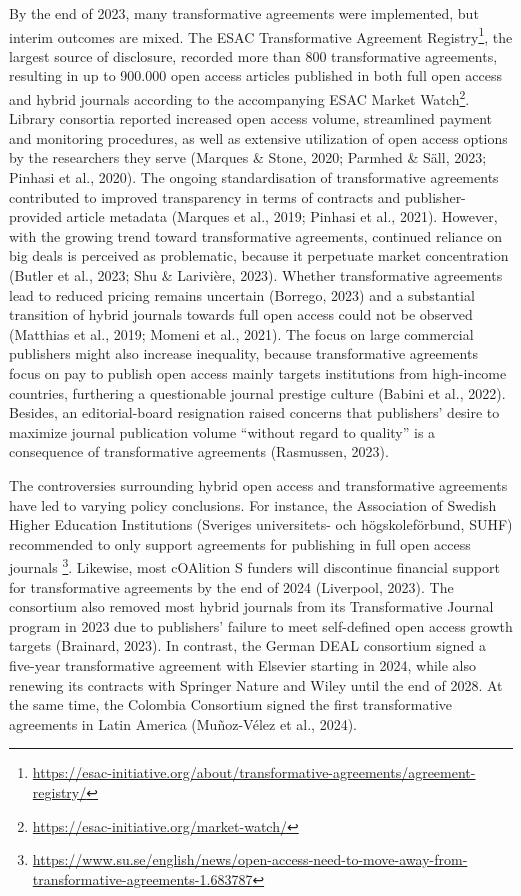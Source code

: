 \documentclass[a4paper,man,floatsintext,longtable,noextraspace,12pt]{apa6}
\begin{document}
By the end of 2023, many transformative agreements were implemented, but
interim outcomes are mixed. The ESAC Transformative Agreement
Registry\footnote{\url{https://esac-initiative.org/about/transformative-agreements/agreement-registry/}},
the largest source of disclosure, recorded more than 800 transformative
agreements, resulting in up to 900.000 open access articles published in
both full open access and hybrid journals according to the accompanying
ESAC Market Watch\footnote{\url{https://esac-initiative.org/market-watch/}}.
Library consortia reported increased open access volume, streamlined
payment and monitoring procedures, as well as extensive utilization of
open access options by the researchers they serve (Marques \& Stone,
2020; Parmhed \& Säll, 2023; Pinhasi et al., 2020). The ongoing
standardisation of transformative agreements contributed to improved
transparency in terms of contracts and publisher-provided article
metadata (Marques et al., 2019; Pinhasi et al., 2021). However, with the
growing trend toward transformative agreements, continued reliance on
big deals is perceived as problematic, because it perpetuate market
concentration (Butler et al., 2023; Shu \& Larivière, 2023). Whether
transformative agreements lead to reduced pricing remains uncertain
(Borrego, 2023) and a substantial transition of hybrid journals towards
full open access could not be observed (Matthias et al., 2019; Momeni et
al., 2021). The focus on large commercial publishers might also increase
inequality, because transformative agreements focus on pay to publish
open access mainly targets institutions from high-income countries,
furthering a questionable journal prestige culture (Babini et al.,
2022). Besides, an editorial-board resignation raised concerns that
publishers' desire to maximize journal publication volume ``without
regard to quality'' is a consequence of transformative agreements
(Rasmussen, 2023).

The controversies surrounding hybrid open access and transformative
agreements have led to varying policy conclusions. For instance, the
Association of Swedish Higher Education Institutions (Sveriges
universitets- och högskoleförbund, SUHF) recommended to only support
agreements for publishing in full open access journals \footnote{\url{https://www.su.se/english/news/open-access-need-to-move-away-from-transformative-agreements-1.683787}}.
Likewise, most cOAlition S funders will discontinue financial support
for transformative agreements by the end of 2024 (Liverpool, 2023). The
consortium also removed most hybrid journals from its Transformative
Journal program in 2023 due to publishers' failure to meet self-defined
open access growth targets (Brainard, 2023). In contrast, the German
DEAL consortium signed a five-year transformative agreement with
Elsevier starting in 2024, while also renewing its contracts with
Springer Nature and Wiley until the end of 2028. At the same time, the
Colombia Consortium signed the first transformative agreements in Latin
America (Muñoz-Vélez et al., 2024).
\end{document}
